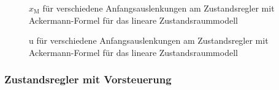 \documentclass[
	pagesize,
	fontsize=12pt,
	paper=a4,
	oneside,
   reqno
]{scrartcl}
\begin{document}
\begin{figure}[H]
    \centering
    \caption[$x_{\mathrm{M}}$ für Regler mit Ackermann-Formel (linear)]{$x_{\mathrm{M}}$ für verschiedene Anfangsauslenkungen am Zustandsregler mit Ackermann-Formel für das lineare Zustandsraummodell}
    \label{fig:Bild13}
\end{figure}

\begin{figure}[H]
    \centering
    \caption[u für Regler mit Ackermann-Formel (linear)]{u für verschiedene Anfangsauslenkungen am Zustandsregler mit Ackermann-Formel für das lineare Zustandsraummodell}
    \label{fig:Bild14}
\end{figure}

\subsubsection{Zustandsregler mit Vorsteuerung}
\end{document}
